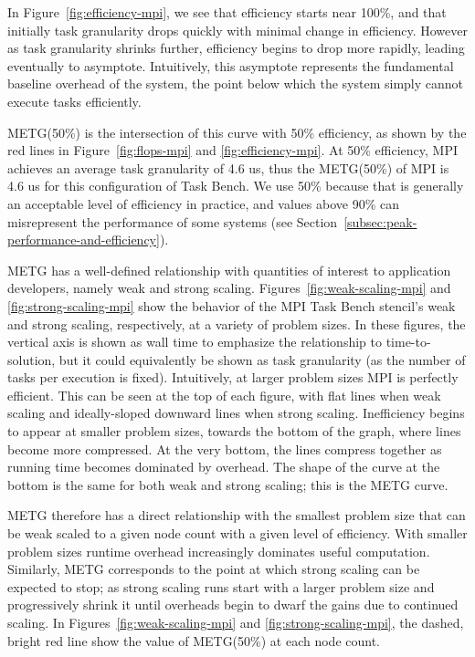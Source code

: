 In Figure~\ref{fig:efficiency-mpi}, we see that
efficiency starts near 100\%, and that initially task granularity
drops quickly with minimal change in efficiency. However as task
granularity shrinks further, efficiency begins to drop more rapidly, leading
eventually to asymptote. Intuitively, this asymptote
represents the fundamental baseline overhead of the system, the point
below which the system simply cannot execute tasks efficiently.


METG(50\%) is the intersection of this curve with 50\% efficiency, as
shown by the red lines in Figure~\ref{fig:flops-mpi} and
\ref{fig:efficiency-mpi}. At 50\% efficiency, MPI achieves an average
task granularity of
4.6 us, thus the METG(50\%) of MPI is 4.6 us for this configuration of
Task Bench. We use 50\% because that is generally an acceptable level
of efficiency in practice, and values above 90\% can misrepresent the
performance of some systems (see
Section~\ref{subsec:peak-performance-and-efficiency}).

METG has a well-defined
relationship with quantities of interest to application developers,
namely weak and strong scaling. Figures~\ref{fig:weak-scaling-mpi} and
\ref{fig:strong-scaling-mpi} show the behavior of the MPI Task Bench stencil's weak and strong
scaling, respectively, at a variety of problem sizes. In these
figures, the vertical axis is shown as wall time to emphasize the
relationship to time-to-solution, but it could equivalently be shown
as task granularity (as the number of tasks per execution is
fixed). Intuitively, at
larger problem sizes MPI is perfectly efficient. This can be seen at
the top of each figure, with flat lines when weak scaling and
ideally-sloped downward lines when strong scaling. Inefficiency begins
to appear at smaller problem sizes, towards the bottom of the graph,
where lines become more compressed. At the
very bottom, the lines compress together as running time becomes dominated by overhead. The shape of the curve at the bottom is the same
for both weak and strong scaling; this is
the METG curve.




METG therefore has a direct relationship with the smallest problem
size that can be weak scaled to a given node count with a given level
of efficiency. With smaller problem sizes runtime overhead increasingly dominates useful
computation. Similarly, METG corresponds to the point at which strong
scaling can be expected to stop; as strong scaling runs start with a
larger problem size and progressively shrink it until overheads begin
to dwarf the gains due to continued scaling. In
Figures~\ref{fig:weak-scaling-mpi} and \ref{fig:strong-scaling-mpi},
the dashed, bright red line show the value of METG(50\%) at each node
count.

